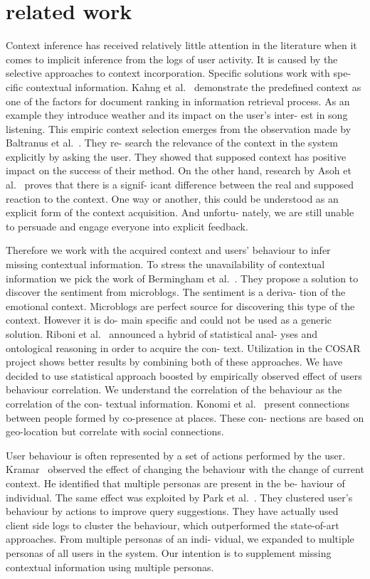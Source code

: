 \documentclass{acm_proc_article-sp} %
\begin{document}
\section{related work}
Context inference has received relatively little attention
in the literature when it comes to implicit inference from the
logs of user activity. It is caused by the selective approaches
to context incorporation. Specific solutions work with spe-
cific contextual information. Kahng et al.~\cite{kahng2011ranking} demonstrate
the predefined context as one of the factors for document
ranking in information retrieval process. As an example
they introduce weather and its impact on the user's inter-
est in song listening. This empiric context selection emerges
from the observation made by Baltranus et al.~\cite{baltrunas2012context}. They re-
search the relevance of the context in the system explicitly
by asking the user. They showed that supposed context has
positive impact on the success of their method. On the other
hand, research by Asoh et al.~\cite{asoh2010analysis} proves that there is a signif-
icant difference between the real and supposed reaction to
the context. One way or another, this could be understood
as an explicit form of the context acquisition. And unfortu-
nately, we are still unable to persuade and engage everyone
into explicit feedback.

Therefore we work with the acquired context and users'
behaviour to infer missing contextual information. To stress
the unavailability of contextual information we pick the work
of Bermingham et al.~\cite{bermingham2010classifying}. They propose a solution to discover
the sentiment from microblogs. The sentiment is a deriva-
tion of the emotional context. Microblogs are perfect source
for discovering this type of the context. However it is do-
main specific and could not be used as a generic solution.
Riboni et al.~\cite{riboni2011cosar} announced a hybrid of statistical anal-
yses and ontological reasoning in order to acquire the con-
text. Utilization in the COSAR project shows better results
by combining both of these approaches. We have decided
to use statistical approach boosted by empirically observed
effect of users behaviour correlation. We understand the
correlation of the behaviour as the correlation of the con-
textual information. Konomi et al.~\cite{konomi2011colocation} present connections
between people formed by co-presence at places. These con-
nections are based on geo-location but correlate with social
connections.

User behaviour is often represented by a set of actions
performed by the user. Kramar~\cite{kramar2011towards} observed the effect of
changing the behaviour with the change of current context.
He identified that multiple personas are present in the be-
haviour of individual. The same effect was exploited by
Park et al.~\cite{park2011empirical}. They clustered user's behaviour by actions
to improve query suggestions. They have actually used client
side logs to cluster the behaviour, which outperformed the
state-of-art approaches. From multiple personas of an indi-
vidual, we expanded to multiple personas of all users in the
system. Our intention is to supplement missing contextual
information using multiple personas.
\end{document}
